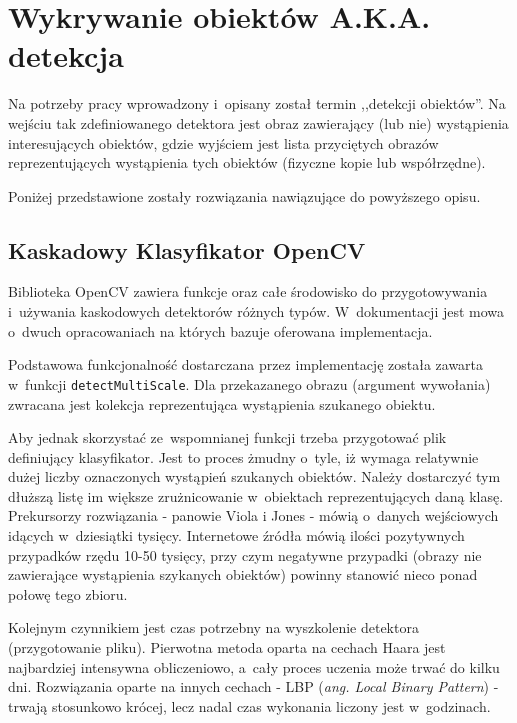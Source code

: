\section{Wykrywanie obiektów A.K.A. detekcja}

Na potrzeby pracy wprowadzony i~opisany został termin 
,,detekcji obiektów''. Na wejściu tak zdefiniowanego detektora
jest obraz zawierający (lub nie) wystąpienia interesujących obiektów, gdzie
wyjściem jest lista przyciętych obrazów reprezentujących wystąpienia tych
obiektów (fizyczne kopie lub współrzędne).

Poniżej przedstawione zostały rozwiązania nawiązujące do powyższego opisu.

\subsection{Kaskadowy Klasyfikator OpenCV}

Biblioteka OpenCV zawiera funkcje oraz całe środowisko do przygotowywania
i~używania kaskodowych detektorów różnych typów. W~dokumentacji
\cite{OCV:cascadeclassification}
jest mowa o~dwuch opracowaniach \cite{DBLP:conf/cvpr/ViolaJ01,
DBLP:conf/icip/LienhartM02} na których bazuje oferowana
implementacja.

Podstawowa funkcjonalność dostarczana przez implementację została zawarta
w~funkcji \verb|detectMultiScale|. Dla przekazanego obrazu (argument wywołania)
zwracana jest kolekcja reprezentująca wystąpienia szukanego obiektu.

Aby jednak skorzystać ze~wspomnianej funkcji trzeba przygotować plik
definiujący klasyfikator. Jest to proces żmudny o~tyle, iż wymaga relatywnie
dużej liczby oznaczonych wystąpień szukanych obiektów. Należy dostarczyć
tym dłuższą listę im większe zrużnicowanie w~obiektach reprezentujących
daną klasę. Prekursorzy rozwiązania - panowie Viola i Jones - mówią
o~danych wejściowych idących w~dziesiątki tysięcy. Internetowe źródła
mówią ilości pozytywnych przypadków rzędu 10-50 tysięcy, przy czym
negatywne przypadki (obrazy nie zawierające wystąpienia szykanych obiektów)
powinny stanowić nieco ponad połowę tego zbioru.

Kolejnym czynnikiem jest czas potrzebny na wyszkolenie detektora
(przygotowanie pliku). Pierwotna metoda oparta na cechach Haara
jest najbardziej intensywna obliczeniowo, a~cały proces uczenia
może trwać do kilku dni. Rozwiązania oparte na innych cechach - LBP
(\textit{ang. Local Binary Pattern}) - trwają stosunkowo krócej, lecz
nadal czas wykonania liczony jest w~godzinach.

